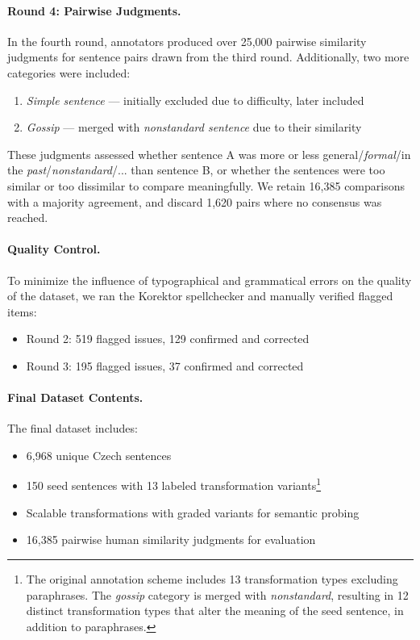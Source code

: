 \paragraph{Round 4: Pairwise Judgments.}  

In the fourth round, annotators produced over 25{,}000 pairwise similarity judgments for sentence pairs drawn from the third round. Additionally, two more categories were included:

\begin{enumerate}
    \item \emph{Simple sentence} --- initially excluded due to difficulty, later included
    \item \emph{Gossip} --- merged with \emph{nonstandard sentence} due to their similarity
\end{enumerate}

These judgments assessed whether sentence A was more or less {general}/\textit{formal}/in the \textit{past}/\textit{nonstandard}/... than sentence B, or whether the sentences were too similar or too dissimilar to compare meaningfully. We retain 16{,}385 comparisons with a majority agreement, and discard 1{,}620 pairs where no consensus was reached.

\paragraph{Quality Control.}  
To minimize the influence of typographical and grammatical errors on the quality of the dataset, we ran the Korektor spellchecker \citep{richter12} and manually verified flagged items:
\begin{itemize}
    \item Round 2: 519 flagged issues, 129 confirmed and corrected
    \item Round 3: 195 flagged issues, 37 confirmed and corrected
\end{itemize}

\paragraph{Final Dataset Contents.}  
The final \costra dataset includes:
\begin{itemize}
    \item 6{,}968 unique Czech sentences
    \item 150 seed sentences with 13 labeled transformation variants\footnote{The original annotation scheme includes 13 transformation types excluding paraphrases. The \emph{gossip} category is merged with \emph{nonstandard}, resulting in 12 distinct transformation types that alter the meaning of the seed sentence, in addition to paraphrases.}
    \item Scalable transformations with graded variants for semantic probing
    \item 16{,}385 pairwise human similarity judgments for evaluation
\end{itemize}

